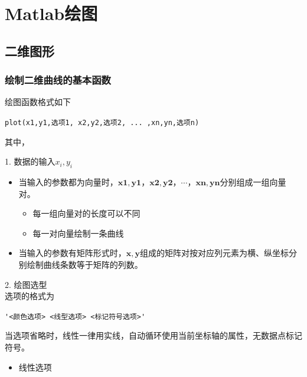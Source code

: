 \chapter{Matlab绘图}
\thispagestyle{empty}
\section{二维图形}
\subsection{绘制二维曲线的基本函数}
绘图函数格式如下
\begin{center}
	\lstinline|plot(x1,y1,选项1, x2,y2,选项2, ... ,xn,yn,选项n)|
\end{center}
其中，
\begin{myitemize}
	\item 1. 数据的输入$x_i,y_i$
	\begin{itemize}
		\item 当输入的参数都为向量时，$\bm{x1},\bm{y1}$，$\bm{x2},\bm{y2}$，$\cdots$，$\bm{xn},\bm{yn}$分别组成一组向量对。
		\begin{itemize}
			\item 每一组向量对的长度可以不同
			\item 每一对向量绘制一条曲线
		\end{itemize}
		\item 当输入的参数有矩阵形式时，$\bm{x},\bm{y}$组成的矩阵对按对应列元素为横、纵坐标分别绘制曲线条数等于矩阵的列数。
	\end{itemize}
	\item 2. 绘图选型\\
	\hspace*{2em}选项的格式为\vspace*{-1.5em}
	\begin{center}
		\lstinline|'<颜色选项> <线型选项> <标记符号选项>'|
	\end{center}
\vspace*{-1em}
	\hspace*{2em}当选项省略时，线性一律用实线，自动循环使用当前坐标轴的属性，无数据点标记符号。
	\begin{itemize}
		\item 线性选项
		\begin{center}
\end{center}
\end{itemize}
\end{myitemize}
